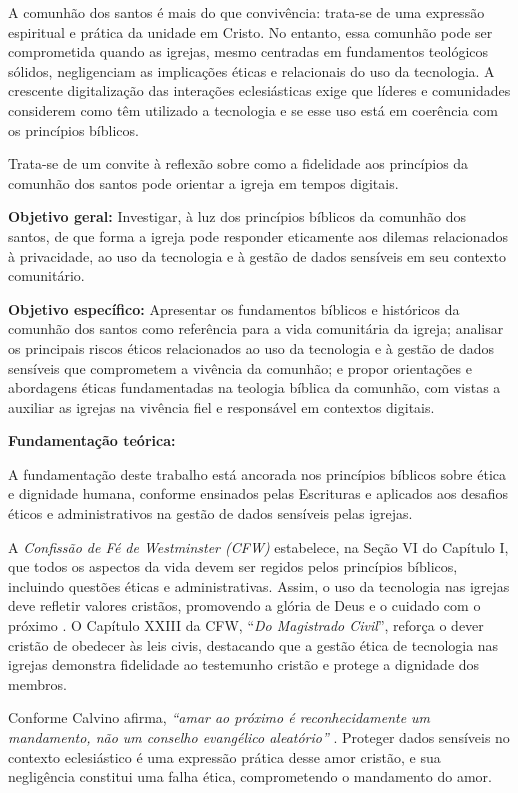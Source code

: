 \documentclass[12pt,a4paper]{article}
\begin{document}
A comunhão dos santos é mais do que convivência: trata-se de uma expressão espiritual e prática da unidade em Cristo. No entanto, essa comunhão pode ser comprometida quando as igrejas, mesmo centradas em fundamentos teológicos sólidos, negligenciam as implicações éticas e relacionais do uso da tecnologia. A crescente digitalização das interações eclesiásticas exige que líderes e comunidades considerem como têm utilizado a tecnologia e se esse uso está em coerência com os princípios bíblicos.

Trata-se de um convite à reflexão sobre como a fidelidade aos princípios da comunhão dos santos pode orientar a igreja em tempos digitais.

\noindent
\textbf{Objetivo geral:} Investigar, à luz dos princípios bíblicos da comunhão dos santos, de que forma a igreja pode responder eticamente aos dilemas relacionados à privacidade, ao uso da tecnologia e à gestão de dados sensíveis em seu contexto comunitário.

\noindent
\textbf{Objetivo específico:} Apresentar os fundamentos bíblicos e históricos da comunhão dos santos como referência para a vida comunitária da igreja; analisar os principais riscos éticos relacionados ao uso da tecnologia e à gestão de dados sensíveis que comprometem a vivência da comunhão; e propor orientações e abordagens éticas fundamentadas na teologia bíblica da comunhão, com vistas a auxiliar as igrejas na vivência fiel e responsável em contextos digitais.

\noindent
\textbf{Fundamentação teórica:}

A fundamentação deste trabalho está ancorada nos princípios bíblicos sobre ética e dignidade humana, conforme ensinados pelas Escrituras e aplicados aos desafios éticos e administrativos na gestão de dados sensíveis pelas igrejas.

A \textit{Confissão de Fé de Westminster (CFW)} estabelece, na Seção VI do Capítulo I, que todos os aspectos da vida devem ser regidos pelos princípios bíblicos, incluindo questões éticas e administrativas. Assim, o uso da tecnologia nas igrejas deve refletir valores cristãos, promovendo a glória de Deus e o cuidado com o próximo \cite{cfw}. O Capítulo XXIII da CFW, ``\textit{Do Magistrado Civil}'', reforça o dever cristão de obedecer às leis civis, destacando que a gestão ética de tecnologia nas igrejas demonstra fidelidade ao testemunho cristão e protege a dignidade dos membros.

Conforme Calvino afirma, \textit {``amar ao próximo é reconhecidamente um mandamento, não um conselho evangélico aleatório''} \cite[p. 453]{calvino2022}. Proteger dados sensíveis no contexto eclesiástico é uma expressão prática desse amor cristão, e sua negligência constitui uma falha ética, comprometendo o mandamento do amor.
\end{document}
